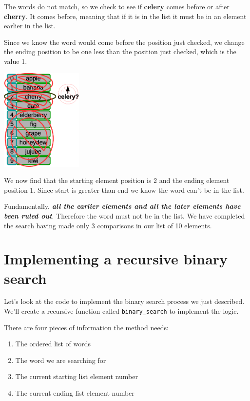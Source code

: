 The words do not match, so we check to see if \textbf{celery} comes before or after \textbf{cherry}. It comes before, meaning that if it is in the list it must be in an element earlier in the list. 

Since we know the word would come before the position just checked, we change the ending position to be one less than the position just checked, which is the value 1. 

\beforefig
\centerline{\includegraphics[height=2in]{figs2/recursion-binsearch-failure-6.eps}}
\afterfig

We now find that the starting element position is 2 and the ending element position 1. Since start is greater than end we know the word can't be in the list. 

Fundamentally, \textbf{\textit{all the earlier elements and all the later elements have been ruled out}}. Therefore the word must not be in the list. We have completed the search having made only 3 comparisons in our list of 10 elements.

\section{Implementing a recursive binary search}

Let's look at the code to implement the binary search process we just described. We'll create a recursive function called \texttt{binary\_search} to implement the logic.


There are four pieces of information the method needs:

\begin{enumerate}
	\item The ordered list of words
	\item The word we are searching for
	\item The current starting list element number
	\item The current ending list element number
\end{enumerate}

